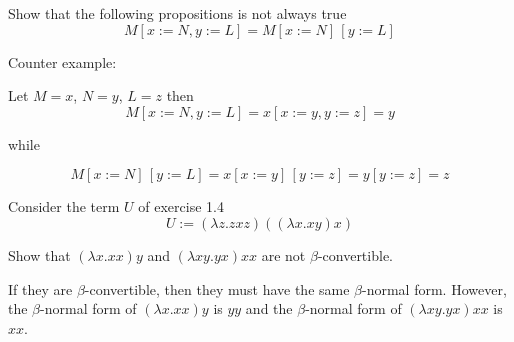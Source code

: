 \documentclass[12pt]{exam}
\begin{document}
\begin{questions}
\question 

\question 

\question 

\question 

\question Show that the following propositions is not always true
\[M[ x:=N, y:=L] = M[ x:=N]\,[ y:=L]\]

\begin{solution}

Counter example:

Let $M=x$, $N=y$, $L=z$ then
\[M[ x:=N, y:=L] = x[ x:=y, y:=z] = y\]

while 

\[M[ x:=N]\,[ y:=L] = x[ x:=y]\,[y:=z] = y[y:=z] = z\]
\end{solution}


\question Consider the term $U$ of exercise 1.4 
\[U := (\lambda z. zxz) ((\lambda x. xy)x)\]
\begin{solution}
\end{solution}

\question 
Show that $(\lambda x. xx)y$ and $(\lambda xy. yx)xx$ are not $\beta$-convertible.
\begin{solution}
If they are $\beta$-convertible, then they must have the same $\beta$-normal form. However, the $\beta$-normal form of $(\lambda x. xx)y$ is $yy$ and the $\beta$-normal form of $(\lambda xy. yx)xx$ is $xx$.
\end{solution}


\end{questions}
\end{document}
